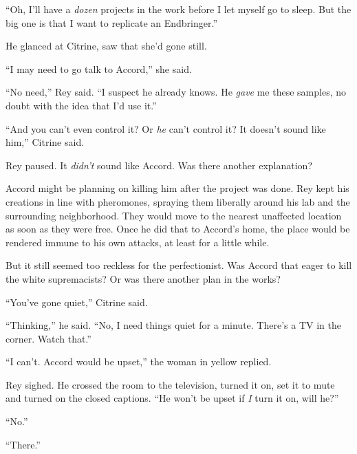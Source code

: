 ``Oh, I'll have a \emph{dozen} projects in the work before I let myself go to sleep.  But the big one is that I want to replicate an Endbringer.''



He glanced at Citrine, saw that she'd gone still.



``I may need to go talk to Accord,'' she said.



``No need,'' Rey said.  ``I suspect he already knows.  He \emph{gave} me these samples, no doubt with the idea that I'd use it.''



``And you can't even control it?  Or \emph{he} can't control it?  It doesn't sound like him,'' Citrine said.



Rey paused.  It \emph{didn't} sound like Accord.  Was there another explanation?



Accord might be planning on killing him after the project was done.  Rey kept his creations in line with pheromones, spraying them liberally around his lab and the surrounding neighborhood.  They would move to the nearest unaffected location as soon as they were free.  Once he did that to Accord's home, the place would be rendered immune to his own attacks, at least for a little while.



But it still seemed too reckless for the perfectionist.  Was Accord that eager to kill the white supremacists?  Or was there another plan in the works?



``You've gone quiet,'' Citrine said.



``Thinking,'' he said.  ``No, I need things quiet for a minute.  There's a TV in the corner.  Watch that.''



``I can't.  Accord would be upset,'' the woman in yellow replied.



Rey sighed.  He crossed the room to the television, turned it on, set it to mute and turned on the closed captions.  ``He won't be upset if \emph{I} turn it on, will he?''



``No.''



``There.''



